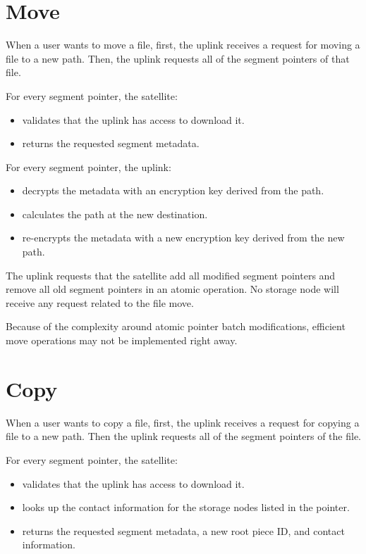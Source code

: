 \documentclass[11pt,fleqn,openany]{book}
\begin{document}
\section{Move}

When a user wants to move a file,
first, the uplink receives a request for moving a file to a new path.
Then, the uplink requests all of the segment pointers of that file.

For every segment pointer, the satellite:
  \begin{itemize}
  \item validates that the uplink has access to download it.
  \item returns the requested segment metadata.
  \end{itemize}

For every segment pointer, the uplink:
  \begin{itemize}
  \item decrypts the metadata with an encryption key derived from the path.
  \item calculates the path at the new destination.
  \item re-encrypts the metadata with a new encryption key derived from the
    new path.
  \end{itemize}

 The uplink requests that the satellite add
  all modified segment pointers and remove all old segment pointers in an
  atomic operation.
 No storage node will receive any request related to the file move.

Because of the complexity around atomic pointer batch modifications, efficient
move operations may not be implemented right away.

\section{Copy}

When a user wants to copy a file, first, the uplink receives a request for
copying a file to a new path.
Then the uplink requests all of the segment pointers of the file.

For every segment pointer, the satellite:
  \begin{itemize}
  \item validates that the uplink has access to download it.
  \item looks up the contact information for the storage nodes listed in the
    pointer.
  \item returns the requested segment metadata, a new root piece ID, and
    contact information.
  \end{itemize}
\end{document}
